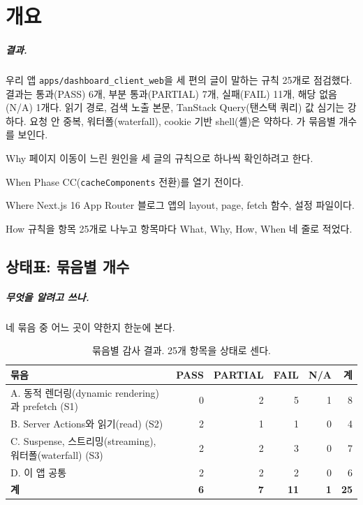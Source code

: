 \chapter{개요}\label{ch:overview}

\paragraph{결과.}
우리 앱 \texttt{apps/dashboard\_client\_web}을 세 편의 글이 말하는 규칙 25개로 점검했다.
결과는 통과(PASS) 6개, 부분 통과(PARTIAL) 7개, 실패(FAIL) 11개, 해당 없음(N/A) 1개다.
읽기 경로, 검색 노출 본문, TanStack Query(탠스택 쿼리) 값 심기는 강하다.
요청 안 중복, 워터폴(waterfall), cookie 기반 shell(셸)은 약하다.
가 묶음별 개수를 보인다.

\begin{inbrief}
  \item[Why] 페이지 이동이 느린 원인을 세 글의 규칙으로 하나씩 확인하려고 한다.
  \item[When] Phase CC(\texttt{cacheComponents} 전환)를 열기 전이다.
  \item[Where] Next.js 16 App Router 블로그 앱의 layout, page, fetch 함수, 설정 파일이다.
  \item[How] 규칙을 항목 25개로 나누고 항목마다 What, Why, How, When 네 줄로 적었다.
\end{inbrief}

\section{상태표: 묶음별 개수}\label{sec:ov-status}

\paragraph{무엇을 알려고 쓰나.}
네 묶음 중 어느 곳이 약한지 한눈에 본다.

\begin{table}[H]
  \caption{묶음별 감사 결과. 25개 항목을 상태로 센다.}
  \label{tab:ov-status}
  \centering\small
  \begin{tabularx}{\linewidth}{@{}Y r r r r r@{}}
    \toprule
    묶음 & PASS & PARTIAL & FAIL & N/A & 계 \\
    \midrule
    A. 동적 렌더링(dynamic rendering)과 prefetch (S1) & 0 & 2 & 5 & 1 & 8 \\
    \midrule
    B. Server Actions와 읽기(read) (S2) & 2 & 1 & 1 & 0 & 4 \\
    \midrule
    C. Suspense, 스트리밍(streaming), 워터폴(waterfall) (S3) & 2 & 2 & 3 & 0 & 7 \\
    \midrule
    D. 이 앱 공통 & 2 & 2 & 2 & 0 & 6 \\
    \midrule
    \textbf{계} & \textbf{6} & \textbf{7} & \textbf{11} & \textbf{1} & \textbf{25} \\
    \bottomrule
  \end{tabularx}
\end{table}


